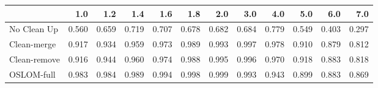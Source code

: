 \begin{tabular}{lrrrrrrrrrrr}
\toprule
{} &   1.0 &   1.2 &   1.4 &   1.6 &   1.8 &   2.0 &   3.0 &   4.0 &   5.0 &   6.0 &   7.0 \\
\midrule
No Clean Up  & 0.560 & 0.659 & 0.719 & 0.707 & 0.678 & 0.682 & 0.684 & 0.779 & 0.549 & 0.403 & 0.297 \\
Clean-merge  & 0.917 & 0.934 & 0.959 & 0.973 & 0.989 & 0.993 & 0.997 & 0.978 & 0.910 & 0.879 & 0.812 \\
Clean-remove & 0.916 & 0.944 & 0.960 & 0.974 & 0.988 & 0.995 & 0.996 & 0.970 & 0.918 & 0.883 & 0.818 \\
OSLOM-full   & 0.983 & 0.984 & 0.989 & 0.994 & 0.998 & 0.999 & 0.993 & 0.943 & 0.899 & 0.883 & 0.869 \\
\bottomrule
\end{tabular}
